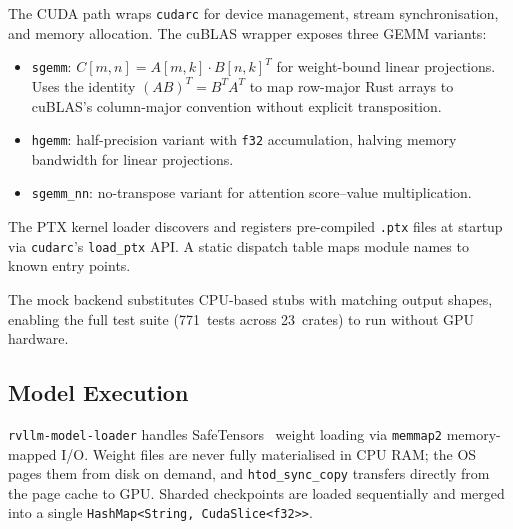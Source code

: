 \documentclass[11pt,a4paper]{article}
\begin{document}
The CUDA path wraps \texttt{cudarc} for device management, stream synchronisation,
and memory allocation. The cuBLAS wrapper exposes three GEMM variants:

\begin{itemize}
  \item \texttt{sgemm}: $C[m,n] = A[m,k] \cdot B[n,k]^T$ for weight-bound linear
        projections. Uses the identity $(AB)^T = B^T A^T$ to map row-major Rust arrays
        to cuBLAS's column-major convention without explicit transposition.
  \item \texttt{hgemm}: half-precision variant with \texttt{f32} accumulation, halving
        memory bandwidth for linear projections.
  \item \texttt{sgemm\_nn}: no-transpose variant for attention score--value
        multiplication.
\end{itemize}

The PTX kernel loader discovers and registers pre-compiled \texttt{.ptx} files at
startup via \texttt{cudarc}'s \texttt{load\_ptx} API. A static dispatch table maps
module names to known entry points.

The mock backend substitutes CPU-based stubs with matching output shapes, enabling
the full test suite (771~tests across 23~crates) to run without GPU hardware.

\subsection{Model Execution}

\texttt{rvllm-model-loader} handles SafeTensors~\cite{safetensors2023} weight loading
via \texttt{memmap2} memory-mapped I/O. Weight files are never fully materialised in
CPU RAM; the OS pages them from disk on demand, and \texttt{htod\_sync\_copy}
transfers directly from the page cache to GPU. Sharded checkpoints are loaded
sequentially and merged into a single \texttt{HashMap<String, CudaSlice<f32>{}>}.
\end{document}
